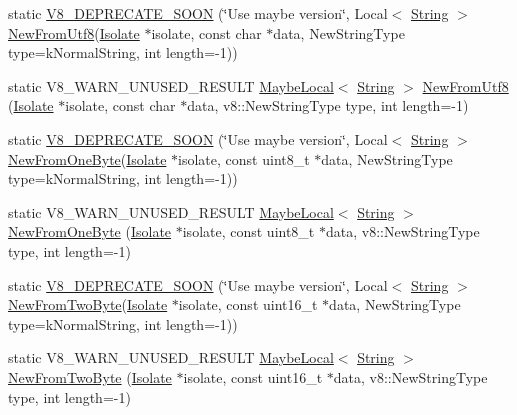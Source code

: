 \begin{DoxyCompactItemize}
\item 
static \hyperlink{classv8_1_1String_aa9d64688e3535b3daabafcc46a59ce5a}{V8\+\_\+\+D\+E\+P\+R\+E\+C\+A\+T\+E\+\_\+\+S\+O\+O\+N} (\char`\"{}Use maybe version\char`\"{}, Local$<$ \hyperlink{classv8_1_1String}{String} $>$ \hyperlink{classv8_1_1String_a851bcf20fecb01b97f14131ce609f701}{New\+From\+Utf8}(\hyperlink{classv8_1_1Isolate}{Isolate} $\ast$isolate, const char $\ast$data, New\+String\+Type type=k\+Normal\+String, int length=-\/1))
\item 
static V8\+\_\+\+W\+A\+R\+N\+\_\+\+U\+N\+U\+S\+E\+D\+\_\+\+R\+E\+S\+U\+L\+T \hyperlink{classv8_1_1MaybeLocal}{Maybe\+Local}$<$ \hyperlink{classv8_1_1String}{String} $>$ \hyperlink{classv8_1_1String_a851bcf20fecb01b97f14131ce609f701}{New\+From\+Utf8} (\hyperlink{classv8_1_1Isolate}{Isolate} $\ast$isolate, const char $\ast$data, v8\+::\+New\+String\+Type type, int length=-\/1)
\item 
static \hyperlink{classv8_1_1String_a97b6caaf4674979cfbd2dfd6c12e48f3}{V8\+\_\+\+D\+E\+P\+R\+E\+C\+A\+T\+E\+\_\+\+S\+O\+O\+N} (\char`\"{}Use maybe version\char`\"{}, Local$<$ \hyperlink{classv8_1_1String}{String} $>$ \hyperlink{classv8_1_1String_a2b8cf518523a62d97360c07ed33d8aa6}{New\+From\+One\+Byte}(\hyperlink{classv8_1_1Isolate}{Isolate} $\ast$isolate, const uint8\+\_\+t $\ast$data, New\+String\+Type type=k\+Normal\+String, int length=-\/1))
\item 
static V8\+\_\+\+W\+A\+R\+N\+\_\+\+U\+N\+U\+S\+E\+D\+\_\+\+R\+E\+S\+U\+L\+T \hyperlink{classv8_1_1MaybeLocal}{Maybe\+Local}$<$ \hyperlink{classv8_1_1String}{String} $>$ \hyperlink{classv8_1_1String_a2b8cf518523a62d97360c07ed33d8aa6}{New\+From\+One\+Byte} (\hyperlink{classv8_1_1Isolate}{Isolate} $\ast$isolate, const uint8\+\_\+t $\ast$data, v8\+::\+New\+String\+Type type, int length=-\/1)
\item 
static \hyperlink{classv8_1_1String_aeab948105979e2ffd61eb552b0da4e50}{V8\+\_\+\+D\+E\+P\+R\+E\+C\+A\+T\+E\+\_\+\+S\+O\+O\+N} (\char`\"{}Use maybe version\char`\"{}, Local$<$ \hyperlink{classv8_1_1String}{String} $>$ \hyperlink{classv8_1_1String_aaad4c7c856c29d79db85994c301fe601}{New\+From\+Two\+Byte}(\hyperlink{classv8_1_1Isolate}{Isolate} $\ast$isolate, const uint16\+\_\+t $\ast$data, New\+String\+Type type=k\+Normal\+String, int length=-\/1))
\item 
static V8\+\_\+\+W\+A\+R\+N\+\_\+\+U\+N\+U\+S\+E\+D\+\_\+\+R\+E\+S\+U\+L\+T \hyperlink{classv8_1_1MaybeLocal}{Maybe\+Local}$<$ \hyperlink{classv8_1_1String}{String} $>$ \hyperlink{classv8_1_1String_aaad4c7c856c29d79db85994c301fe601}{New\+From\+Two\+Byte} (\hyperlink{classv8_1_1Isolate}{Isolate} $\ast$isolate, const uint16\+\_\+t $\ast$data, v8\+::\+New\+String\+Type type, int length=-\/1)

\end{DoxyCompactItemize}
